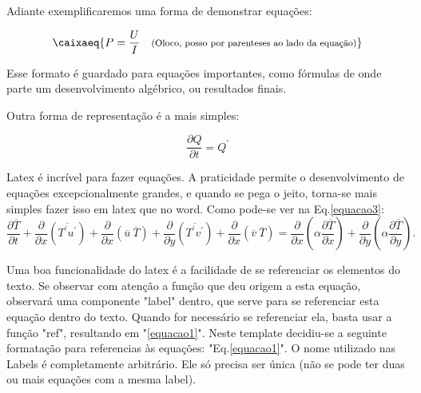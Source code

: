Adiante exemplificaremos uma forma de demonstrar equações:

\begin{equation}\label{equacao1}
	\caixaeq{                            %
		P=\frac{U}{I}                    %
		\quad                            %
		\text{\footnotesize(Oloco, posso por parenteses ao lado da equação)}    %
	} 
\end{equation}

Esse formato é guardado para equações importantes, como fórmulas de onde parte um desenvolvimento algébrico, ou resultados finais.

Outra forma de representação é a mais simples:

\begin{equation}\label{equacao2}
	\frac{\partial Q}{\partial t} = Q^\prime
\end{equation}

Latex é incrível para fazer equações. A praticidade permite o desenvolvimento de equações excepcionalmente grandes, e quando se pega o jeito, torna-se mais simples fazer isso em latex que no word. Como pode-se ver na Eq.\ref{equacao3}:
\begin{equation}\label{equacao3}
	\frac{\partial \overline{T}}{\partial t} +\frac{\partial{}}{\partial{x}} \left(\overline{T^\prime  u^\prime}\right) + \frac{\partial{}}{\partial{x}}\left(\overline{u} \ \overline{T}\right)     + 
	\frac{\partial{}}{\partial{y}} \left(\overline{T^\prime v^\prime}\right) + \frac{\partial{}}{\partial{x}}\left(\overline{v} \ \overline{T}\right) 
	=
	{\frac{\partial{}}{\partial{x}}} \left(\alpha {\frac{\partial{\overline{T}}}{\partial{x}}} \right) +
	{\frac{\partial{}}{\partial{y}}} \left(\alpha {\frac{\partial{\overline{T}}}{\partial{y}}} \right) .
\end{equation}

Uma boa funcionalidade do latex é a facilidade de se referenciar os elementos do texto. Se observar com atenção a função que deu origem a esta equação, observará uma componente "label" dentro, que serve para se referenciar esta equação dentro do texto. Quando for necessário se referenciar ela, basta usar a função "ref", resultando em "\ref{equacao1}". Neste template decidiu-se a seguinte formatação para referencias às equações: "Eq.\ref{equacao1}". O nome utilizado nas Labels é completamente arbitrário. Ele só precisa ser única (não se pode ter duas ou mais equações com a mesma label).

